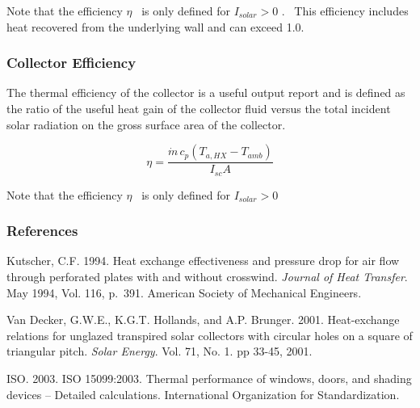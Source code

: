 Note that the efficiency \(\eta\) ~is only defined for \({I_{solar}} > 0\) .~ This efficiency includes heat recovered from the underlying wall and can exceed 1.0.

\subsubsection{Collector Efficiency}\label{collector-efficiency}

The thermal efficiency of the collector is a useful output report and is defined as the ratio of the useful heat gain of the collector fluid versus the total incident solar radiation on the gross surface area of the collector.

\begin{equation}
\eta  = \frac{{\dot m\,{c_p}\left( {{T_{a,HX}} - {T_{amb}}} \right)}}{{{I_{sc}}A}}
\end{equation}

Note that the efficiency \(\eta\) ~is only defined for \({I_{solar}} > 0\)

\subsubsection{References}\label{references-3-003}

Kutscher, C.F. 1994. Heat exchange effectiveness and pressure drop for air flow through perforated plates with and without crosswind. \emph{Journal of Heat Transfer}. May 1994, Vol. 116, p.~391. American Society of Mechanical Engineers.

Van Decker, G.W.E., K.G.T. Hollands, and A.P. Brunger. 2001. Heat-exchange relations for unglazed transpired solar collectors with circular holes on a square of triangular pitch. \emph{Solar Energy}. Vol. 71, No. 1. pp 33-45, 2001.

ISO. 2003. ISO 15099:2003. Thermal performance of windows, doors, and shading devices -- Detailed calculations. International Organization for Standardization.
